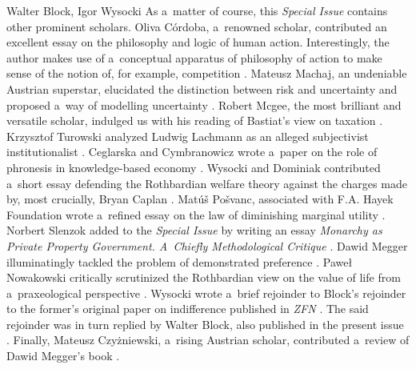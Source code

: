 \begin{editorialeng2auth}{Walter Block, Igor Wysocki}
As a~matter of course, this \textit{Special Issue} contains other prominent scholars. Oliva Córdoba, a~renowned scholar, contributed an excellent essay on the philosophy and logic of human action. Interestingly, the author makes use of a~conceptual apparatus of philosophy of action to make sense of the notion of, for example, competition 
\parencite[][]{oliva_cordoba_philosophy_2024}. %
 Mateusz Machaj, an undeniable Austrian superstar, elucidated the distinction between risk and uncertainty and proposed a~way of modelling uncertainty 
\parencite[][]{machaj_model_2024}. %
 Robert Mcgee, the most brilliant and versatile scholar, indulged us with his reading of Bastiat's view on taxation 
\parencite[][]{mcgee_taxation_2024}. %
 Krzysztof Turowski analyzed Ludwig Lachmann as an alleged subjectivist institutionalist 
\parencite[][]{turowski_ludwig_2024}. %
 Ceglarska and Cymbranowicz wrote a~paper on the role of phronesis in knowledge-based economy 
\parencite[][]{ceglarska_role_2024}. %
 Wysocki and Dominiak contributed a~short essay defending the Rothbardian welfare theory against the charges made by, most crucially, Bryan Caplan 
\parencite[][]{wysocki_rejoinder_2024}. %
 Matúš Pošvanc, associated with F.A. Hayek Foundation wrote a~refined essay on the law of diminishing marginal utility 
\parencite[][]{posvanc_law_2024}. %
 Norbert Slenzok added to the \textit{Special Issue} by writing an essay \textit{Monarchy as Private Property Government. A~Chiefly Methodological Critique} 
\parencite[][]{slenzok_monarchy_2024}. %
 Dawid Megger illuminatingly tackled the problem of demonstrated preference 
\parencite[][]{megger_demonstrated_2024}. %
 Paweł Nowakowski critically scrutinized the Rothbardian view on the value of life from a~praxeological perspective 
\parencite[][]{nowakowski_praxeology_2024}. %
 Wysocki wrote a~brief rejoinder to Block's rejoinder to the former's original paper on indifference published in \textit{ZFN} 
\parencite[][]{wysocki_rejoinder_2024}. %
 The said rejoinder was in turn replied by Walter Block, also published in the present issue 
\parencite[][]{block_response_2024}. %
 Finally, Mateusz Czyżniewski, a~rising Austrian scholar, contributed a~review of Dawid Megger's book 
\parencite[][]{czyzniewski_are_2024}.%





\end{editorialeng2auth}
